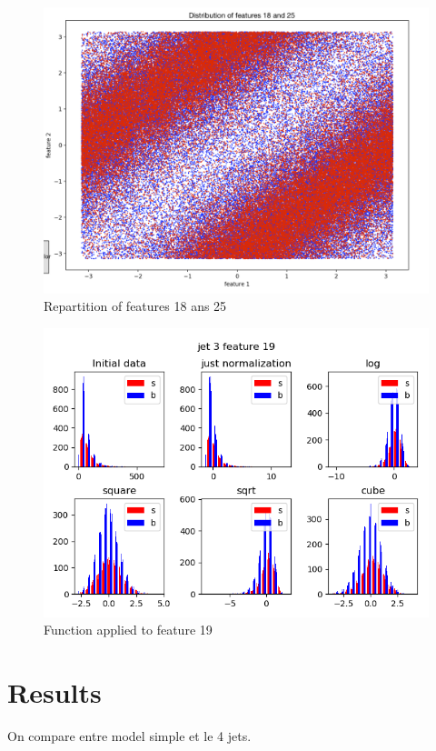 \documentclass[10pt,conference,compsocconf]{IEEEtran}
\begin{document}
\begin{figure}[tbp]
  \centering
  \includegraphics[width=\columnwidth]{features18_25}
  \caption{Repartition of features 18 ans 25}
  \vspace{-3mm}
  \label{fig:feature1825}
\end{figure}
\begin{figure}[tbp]
  \centering
  \includegraphics[width=\columnwidth]{19_3}
  \caption{Function applied to feature 19}
  \vspace{-3mm}
  \label{fig:feature19}
\end{figure}
\section{Results}
On compare entre model simple et le 4 jets.
\end{document}
